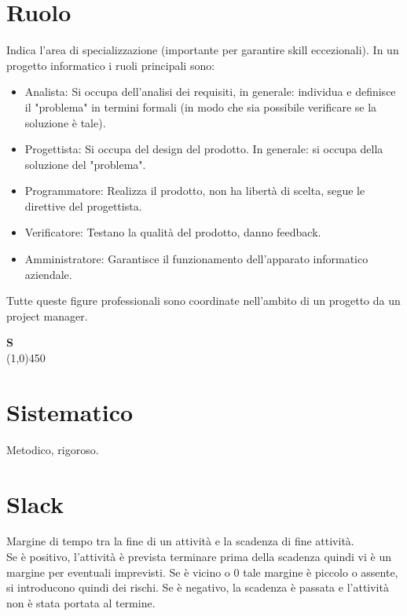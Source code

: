 \documentclass[11pt]{article}
\begin{document}
	\section{\LARGE Ruolo}
	\label{sec:ruolo}
	Indica l'area di specializzazione (importante per garantire skill eccezionali).
	In un progetto informatico i ruoli principali sono:
	\begin{itemize}  
	\item Analista: Si occupa dell'analisi dei requisiti, in generale: individua e definisce il "problema" in termini formali (in modo che sia possibile verificare se la soluzione è tale). 
	\item Progettista: Si occupa del design del prodotto. In generale: si occupa della soluzione del "problema".
	\item Programmatore: Realizza il prodotto, non ha libertà di scelta, segue le direttive del progettista.
	\item Verificatore: Testano la qualità del prodotto, danno feedback.
	\item Amministratore: Garantisce il funzionamento dell'apparato informatico aziendale. 
	\end{itemize}
	Tutte queste figure professionali sono coordinate nell'ambito di un progetto da un project manager.
	\newpage
	
	{\Huge{\textbf{S}}} \\
	\line(1,0){450}
	
	\section{\LARGE Sistematico}
	\label{sec:sistematico}
	Metodico, rigoroso.

	\section{\LARGE Slack}
	\label{sec:slack}
	Margine di tempo tra la fine di un attività e la scadenza di fine attività. \\
	Se è positivo, l'attività è prevista terminare prima della scadenza quindi vi è un margine per eventuali imprevisti. Se è vicino o 0 tale margine è piccolo o assente, si introducono quindi dei rischi. Se è negativo, la scadenza è passata e l'attività non è stata portata al termine.
	
\end{document}

